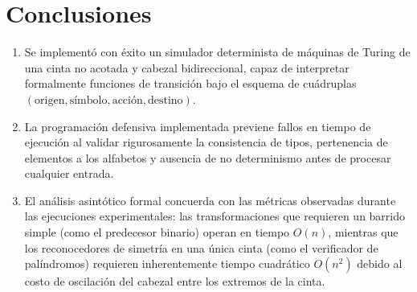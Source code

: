 \documentclass[11pt,letterpaper]{article}
\begin{document}
\section{Conclusiones}
\begin{enumerate}
    \item Se implementó con éxito un simulador determinista de máquinas de Turing de una cinta no acotada y cabezal bidireccional, capaz de interpretar formalmente funciones de transición bajo el esquema de cuádruplas $(\text{origen}, \text{símbolo}, \text{acción}, \text{destino})$.
    \item La programación defensiva implementada previene fallos en tiempo de ejecución al validar rigurosamente la consistencia de tipos, pertenencia de elementos a los alfabetos y ausencia de no determinismo antes de procesar cualquier entrada.
    \item El análisis asintótico formal concuerda con las métricas observadas durante las ejecuciones experimentales: las transformaciones que requieren un barrido simple (como el predecesor binario) operan en tiempo $O(n)$, mientras que los reconocedores de simetría en una única cinta (como el verificador de palíndromos) requieren inherentemente tiempo cuadrático $O(n^2)$ debido al costo de oscilación del cabezal entre los extremos de la cinta.
\end{enumerate}
\end{document}
